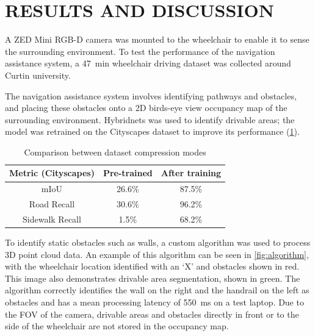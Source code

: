 \documentclass[10pt,twoside]{article}
\begin{document}
\section*{\textbf{RESULTS AND DISCUSSION}} %
A ZED Mini RGB-D camera was mounted to the wheelchair to enable it to
sense the surrounding environment. To test the performance of the navigation
assistance system, a \SI{47}{\minute} wheelchair driving dataset was collected around
Curtin university.

The navigation assistance system involves identifying pathways and obstacles,
and placing these obstacles onto a 2D birds-eye view occupancy map of the
surrounding environment. Hybridnets was used to identify drivable
areas; the model was retrained on the Cityscapes dataset to improve its performance (\cref{table:retraining}).

\begin{table}[H]
    \centering
    \begin{tabular}{c c c}
    \toprule
    Metric (Cityscapes) & Pre-trained & After training \\
    \midrule
    mIoU & 26.6\% & 87.5\% \\
    Road Recall & 30.6\% & 96.2\% \\
    Sidewalk Recall & 1.5\% & 68.2\% \\
    \bottomrule
    \end{tabular}
    \caption{Comparison between dataset compression modes}
    \label{table:retraining}
\end{table}

To identify static obstacles such as walls, a custom algorithm was used to process 3D point cloud data.
An example of this algorithm can be seen in \cref{fig:algorithm},
with the wheelchair location identified with an `X' and obstacles shown in red.
This image also demonstrates drivable area segmentation, shown in green.
The algorithm correctly identifies the wall on the right and the handrail on the left as obstacles
and has a mean processing latency of \SI{550}{\milli\second} on a test laptop.
Due to the FOV of the camera, drivable areas and obstacles directly in front or to the side of
the wheelchair are not stored in the occupancy map.
\end{document}
